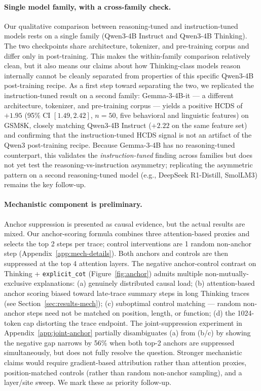 \documentclass{article}
\theoremstyle{plain}
\theoremstyle{definition}
\theoremstyle{remark}
\begin{document}
\paragraph{Single model family, with a cross-family check.}
Our qualitative comparison between reasoning-tuned and instruction-tuned models rests on a single family (Qwen3-4B Instruct and Qwen3-4B Thinking). The two checkpoints share architecture, tokenizer, and pre-training corpus and differ only in post-training. This makes the within-family comparison relatively clean, but it also means our claims about how Thinking-class models reason internally cannot be cleanly separated from properties of this specific Qwen3-4B post-training recipe. As a first step toward separating the two, we replicated the instruction-tuned result on a second family: Gemma-3-4B-it --- a different architecture, tokenizer, and pre-training corpus --- yields a positive HCDS of $+1.95$ (95\% CI $[1.49, 2.42]$, $n=50$, five behavioral and linguistic features) on GSM8K, closely matching Qwen3-4B Instruct ($+2.22$ on the same feature set) and confirming that the instruction-tuned HCDS signal is not an artifact of the Qwen3 post-training recipe. Because Gemma-3-4B has no reasoning-tuned counterpart, this validates the \emph{instruction-tuned} finding across families but does not yet test the reasoning-vs-instruction asymmetry; replicating the asymmetric pattern on a second reasoning-tuned model (e.g., DeepSeek R1-Distill, SmolLM3) remains the key follow-up.

\paragraph{Mechanistic component is preliminary.}
Anchor suppression is presented as causal evidence, but the actual results are mixed. Our anchor-scoring formula combines three attention-based proxies and selects the top 2 steps per trace; control interventions are 1 random non-anchor step (Appendix~\ref{app:mech-details}). Both anchors and controls are then suppressed at the top 4 attention layers. The negative anchor-control contrast on Thinking + \texttt{explicit\_cot} (Figure~\ref{fig:anchor}) admits multiple non-mutually-exclusive explanations: (a) genuinely distributed causal load; (b) attention-based anchor scoring biased toward late-trace summary steps in long Thinking traces (see Section~\ref{sec:results-mech}); (c) suboptimal control matching --- random non-anchor steps need not be matched on position, length, or function; (d) the 1024-token cap distorting the trace endpoint. The joint-suppression experiment in Appendix~\ref{app:joint-anchor} partially disambiguates (a) from (b/c) by showing the negative gap narrows by 56\% when both top-2 anchors are suppressed simultaneously, but does not fully resolve the question. Stronger mechanistic claims would require gradient-based attribution rather than attention proxies, position-matched controls (rather than random non-anchor sampling), and a layer/site sweep. We mark these as priority follow-up.
\end{document}
